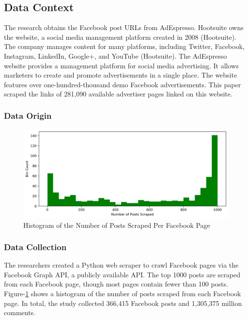 \documentclass{article}
\begin{document}
\subsection{Data Context}
The research obtains the Facebook post URLs from AdEspresso. Hootsuite owns the website, a social media management platform created in 2008 (Hootsuite). The company manages content for many platforms, including Twitter, Facebook, Instagram, LinkedIn, Google+, and YouTube (Hootsuite). The AdEspresso website provides a management platform for social media advertising. It allows marketers to create and promote advertisements in a single place. The website features over one-hundred-thousand demo Facebook advertisements. This paper scraped the links of 281,090 available advertiser pages linked on this website. 

\subsubsection{Data Origin}

\begin{figure}
    \includegraphics[width=\columnwidth]{images/Posts_Per_Page_Histogram.png}
    \caption{Histogram of the Number of Posts Scraped Per Facebook Page}
    \label{fig:histogram_posts_scraped}
\end{figure}


\subsubsection{Data Collection}
The researchers created a Python web scraper to crawl Facebook pages via the Facebook Graph API, a publicly available API. The top 1000 posts are scraped from each Facebook page, though most pages contain fewer than 100 posts. Figure-\ref{fig:histogram_posts_scraped} shows a histogram of the number of posts scraped from each Facebook page. In total, the study collected 366,415 Facebook posts and 1,305,375 million comments.  
\end{document}
